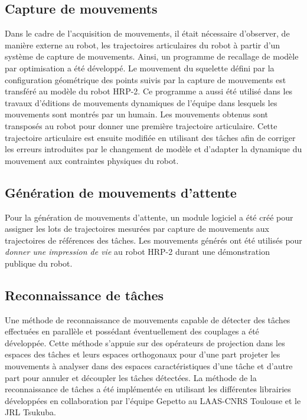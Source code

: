 \subsection*{Capture de mouvements}
Dans le cadre de l'acquisition de mouvements, il était nécessaire d'observer, de manière externe au robot,
les trajectoires articulaires du robot à partir d'un système de capture de mouvements.
Ainsi, un programme de recallage de modèle par optimisation
a été développé. Le mouvement du squelette défini par la configuration géométrique
des points suivis par la capture de mouvements est transféré au modèle
du robot HRP-2.
Ce programme a aussi été utilisé 
dans les travaux d'éditions de mouvements dynamiques de l'équipe dans lesquels 
les mouvements sont montrés par un humain. Les mouvements obtenus
sont transposés au robot pour donner une première trajectoire articulaire.
Cette trajectoire articulaire est ensuite modifiée en utilisant
des t\^aches afin de corriger les erreurs introduites par le changement de modèle et 
d'adapter la dynamique du mouvement aux contraintes physiques du robot.

\subsection*{Génération de mouvements d'attente}
Pour la génération de mouvements d'attente, un module logiciel a été
créé pour assigner les lots de trajectoires mesurées par capture de mouvements
aux trajectoires de références des t\^aches. Les mouvements
générés ont été utilisés pour \emph{donner une impression de vie} au robot
HRP-2 durant une démonstration publique du robot.

\subsection*{Reconnaissance de t\^aches}
Une méthode de reconnaissance de mouvements capable de détecter 
des t\^aches effectuées en parallèle et possédant éventuellement
des couplages a été développée. Cette méthode s'appuie
sur des opérateurs de projection dans les espaces des t\^aches et leurs 
espaces orthogonaux pour d'une part projeter les mouvements à analyser
dans des espaces caractéristiques d'une t\^ache et d'autre part
pour annuler et découpler les t\^aches détectées.
La méthode de la reconnaissance de t\^aches a été implémentée
en utilisant les différentes librairies développées
en collaboration par l'équipe Gepetto au LAAS-CNRS Toulouse et le JRL Tsukuba.


